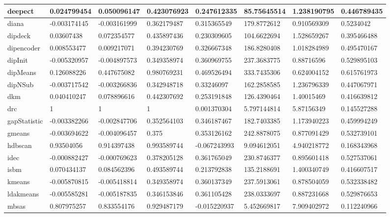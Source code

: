 \begin{table}[H]
\begin{tabular}{|l|l|l|l|l|l|l|l|}
\hline
deepect & 0.024799454 & 0.050096147 & 0.423076923 & 0.247612335 & 85.75645514 & 1.238190795 & 0.446789435 \\
\hline
diana & -0.003174145 & -0.003161999 & 0.362179487 & 0.315365549 & 179.8772612 & 0.910569309 & 0.5234042 \\
\hline
dipdeck & 0.03607438 & 0.072354577 & 0.435897436 & 0.230309605 & 104.6622694 & 1.528659267 & 0.395466488 \\
\hline
dipencoder & 0.008553477 & 0.009217071 & 0.394230769 & 0.326667348 & 186.8280408 & 1.018284989 & 0.495470167 \\
\hline
dipInit & -0.005320957 & -0.004897573 & 0.349358974 & 0.360969755 & 237.3683775 & 0.88716596 & 0.529895103 \\
\hline
dipMeans & 0.126088226 & 0.447675082 & 0.980769231 & 0.469526494 & 333.7435306 & 0.624004152 & 0.615761973 \\
\hline
dipNSub & -0.003717542 & -0.003266836 & 0.342948718 & 0.33246097 & 162.2858585 & 1.236796339 & 0.447067971 \\
\hline
dkm & 0.040410247 & 0.078896616 & 0.442307692 & 0.253191848 & 126.4390464 & 1.40015469 & 0.416639812 \\
\hline
drc & 1 & 1 & 1 & 0.001370304 & 5.797144814 & 5.87156349 & 0.145527288 \\
\hline
gapStatistic & -0.003382266 & -0.002847706 & 0.352564103 & 0.346187467 & 182.7403385 & 1.173940223 & 0.459994249 \\
\hline
gmeans & -0.003694622 & -0.004096457 & 0.375 & 0.353126162 & 242.8878075 & 0.877091429 & 0.532739101 \\
\hline
hdbscan & 0.93504056 & 0.914397438 & 0.993589744 & -0.067243993 & 9.094612051 & 4.940218772 & 0.168343968 \\
\hline
idec & -0.000882427 & -0.000769623 & 0.378205128 & 0.361765049 & 230.8746377 & 0.895601418 & 0.527537061 \\
\hline
isbm & 0.070434137 & 0.084562396 & 0.493589744 & 0.213792838 & 135.2188691 & 1.400340749 & 0.416607517 \\
\hline
kmeans & -0.005870815 & -0.005418814 & 0.349358974 & 0.360137349 & 237.5913061 & 0.878504059 & 0.532338482 \\
\hline
ldakmeans & -0.005585281 & -0.005187835 & 0.346153846 & 0.361105428 & 238.0333697 & 0.887231668 & 0.529876653 \\
\hline
mbsas & 0.807975257 & 0.833554176 & 0.929487179 & -0.015220937 & 5.452669817 & 7.909402972 & 0.112240966 \\

\end{tabular}
\end{table}
